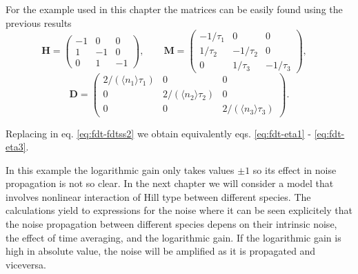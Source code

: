 For the example used in this chapter the matrices can be easily found using the previous results
\begin{equation*}
  \mathbf{H} = \begin{pmatrix}
    -1 & 0 & 0 \\
    1 & -1 & 0 \\
    0 & 1 & -1
  \end{pmatrix},\quad\quad
  \mathbf{M} = \begin{pmatrix}
    -1/\tau_1 & 0 & 0 \\
    1/\tau_2 & -1/\tau_2 & 0 \\
    0 & 1/\tau_3 & -1/\tau_3
  \end{pmatrix},\quad  
\end{equation*}
\begin{equation*}
  \mathbf{D} = \begin{pmatrix}
    2/(\langle n_1\rangle\tau_1) & 0 & 0 \\
    0 & 2/(\langle n_2\rangle\tau_2) & 0 \\
    0 & 0 & 2/(\langle n_3\rangle\tau_3)
  \end{pmatrix}.
\end{equation*}

Replacing in eq. \eqref{eq:fdt-fdtss2} we obtain equivalently eqs. \eqref{eq:fdt-eta1} - \eqref{eq:fdt-eta3}.

In this example the logarithmic gain only takes values $\pm 1$ so its effect in noise propagation is not so clear. In the next chapter we will consider a model that involves nonlinear interaction of Hill type between different species. The calculations yield to expressions for the noise where  it can be seen explicitely that the noise propagation between different species depens on their intrinsic noise, the effect of time averaging, and the logarithmic gain. If the logarithmic gain is high in absolute value, the noise will be amplified as it is propagated and viceversa.
